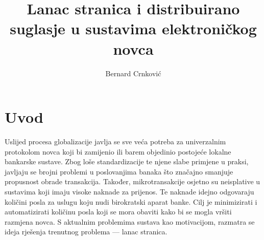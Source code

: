 \documentclass[utf8, zavrsni]{fer}
\begin{document}

\title{Lanac stranica i distribuirano suglasje u sustavima elektroničkog novca}

\author{Bernard Crnković}

\maketitle


\zahvala{}

\tableofcontents

\chapter{Uvod}
Uslijed procesa globalizacije javlja se sve veća potreba za univerzalnim protokolom novca koji bi zamijenio ili barem objedinio postojeće lokalne bankarske sustave. Zbog loše standardizacije te njene slabe primjene u praksi, javljaju se brojni problemi u poslovanjima banaka što značajno smanjuje propusnost obrade transakcija. Također, mikrotransakcije osjetno su neisplative u sustavima koji imaju visoke naknade za prijenos. Te naknade idejno odgovaraju količini posla za uslugu koju nudi birokratski aparat banke. Cilj je minimizirati i automatizirati količinu posla koji se mora obaviti kako bi se mogla vršiti razmjena novca. S aktualnim problemima sustava kao motivacijom, razmatra se ideja rješenja trenutnog problema --- lanac stranica.
\end{document}
